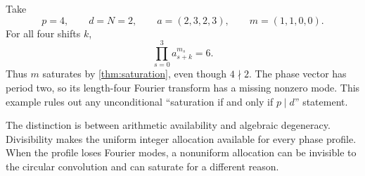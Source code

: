 \begin{example}
\label{ex:nondivisible}
Take
\[
 p=4,\qquad d=N=2,\qquad a=(2,3,2,3),\qquad m=(1,1,0,0).
\]
For all four shifts $k$,
\[
 \prod_{s=0}^3a_{s+k}^{m_s}=6.
\]
Thus $m$ saturates by \cref{thm:saturation}, even though $4\nmid2$.  The
phase vector has period two, so its length-four Fourier transform has a
missing nonzero mode.  This example rules out any unconditional
``saturation if and only if $p\mid d$'' statement.
\end{example}

The distinction is between arithmetic availability and algebraic degeneracy.
Divisibility makes the uniform integer allocation available for every phase
profile.  When the profile loses Fourier modes, a nonuniform allocation can
be invisible to the circular convolution and can saturate for a different
reason.
